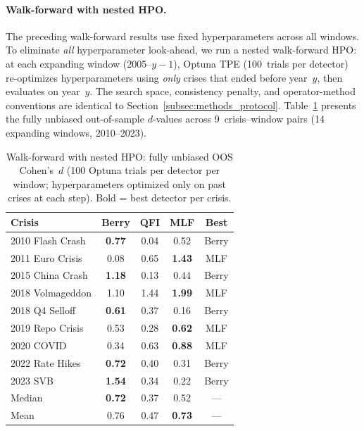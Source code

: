 \documentclass[3p]{elsarticle}
\begin{document}
\paragraph{Walk-forward with nested HPO.}
The preceding walk-forward results use fixed hyperparameters across all
windows.  To eliminate \emph{all} hyperparameter look-ahead, we run a
nested walk-forward HPO: at each expanding window (2005--$y{-}1$),
Optuna TPE (100~trials per detector) re-optimizes hyperparameters using
\emph{only} crises that ended before year~$y$, then evaluates on
year~$y$.  The search space, consistency penalty, and operator-method
conventions are identical to
Section~\ref{subsec:methods_protocol}.  Table~\ref{tab:wf_hpo}
presents the fully unbiased out-of-sample $d$-values across 9~crisis--window
pairs (14 expanding windows, 2010--2023).

\begin{table}[htb]
\centering
\caption{Walk-forward with nested HPO: fully unbiased OOS Cohen's~$d$
  (100 Optuna trials per detector per window; hyperparameters optimized
  only on past crises at each step).  Bold = best detector per crisis.}
\label{tab:wf_hpo}
\small
\begin{tabular}{lcccc}
\toprule
Crisis & Berry & QFI & MLF & Best \\
\midrule
2010 Flash Crash      & \textbf{0.77} & 0.04 & 0.52 & Berry \\
2011 Euro Crisis      & 0.08 & 0.65 & \textbf{1.43} & MLF \\
2015 China Crash      & \textbf{1.18} & 0.13 & 0.44 & Berry \\
2018 Volmageddon      & 1.10 & 1.44 & \textbf{1.99} & MLF \\
2018 Q4 Selloff       & \textbf{0.61} & 0.37 & 0.16 & Berry \\
2019 Repo Crisis      & 0.53 & 0.28 & \textbf{0.62} & MLF \\
2020 COVID            & 0.34 & 0.63 & \textbf{0.88} & MLF \\
2022 Rate Hikes       & \textbf{0.72} & 0.40 & 0.31 & Berry \\
2023 SVB              & \textbf{1.54} & 0.34 & 0.22 & Berry \\
\midrule
Median                & \textbf{0.72} & 0.37 & 0.52 & --- \\
Mean                  & 0.76 & 0.47 & \textbf{0.73} & --- \\
\bottomrule
\end{tabular}

\medskip
{}
\end{table}
\end{document}
